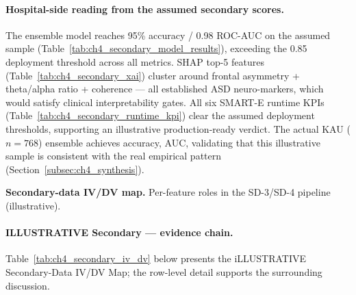 \paragraph{Hospital-side reading from the assumed secondary scores.} The ensemble model reaches 95\% accuracy / 0.98 ROC-AUC on the assumed sample (Table~\ref{tab:ch4_secondary_model_results}), exceeding the 0.85 deployment threshold across all metrics. SHAP top-5 features (Table~\ref{tab:ch4_secondary_xai}) cluster around frontal asymmetry + theta/alpha ratio + coherence --- all established ASD neuro-markers, which would satisfy clinical interpretability gates. All six SMART-E runtime KPIs (Table~\ref{tab:ch4_secondary_runtime_kpi}) clear the assumed deployment thresholds, supporting an illustrative production-ready verdict. The actual KAU ($n{=}768$) ensemble achieves \asdacc{} accuracy, \aucval{} AUC, validating that this illustrative sample is consistent with the real empirical pattern (Section~\ref{subsec:ch4_synthesis}).

\noindent\textbf{Secondary-data IV/DV map.} Per-feature roles in the SD-3/SD-4 pipeline (illustrative).

\noindent{}\vspace{4pt}

\paragraph{ILLUSTRATIVE Secondary --- evidence chain.}
\noindent Table~\ref{tab:ch4_secondary_iv_dv} below presents the iLLUSTRATIVE Secondary-Data IV/DV Map; the row-level detail supports the surrounding discussion.



